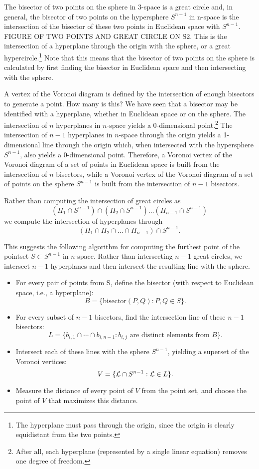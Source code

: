 \documentclass[12pt]{article}
\begin{document}
The bisector of two points on the sphere in 3-space is a great circle and, in general, 
the bisector of two points on the hypersphere $S^{n-1}$ in n-space is 
the intersection of the bisector of these two points in Euclidean space with $S^{n-1}$.
FIGURE OF TWO POINTS AND GREAT CIRCLE ON S2.
This is the intersection of a hyperplane through the origin
with the sphere, or a great hypercircle.\footnote{The
  hyperplane must pass through the origin, since the origin is clearly equidistant
  from the two points.}
Note that this means that the bisector of two points on the sphere is 
calculated by first finding the bisector in Euclidean space 
and then intersecting with the sphere.

A vertex of the Voronoi diagram is defined by the intersection of enough
bisectors to generate a point.
How many is this?
We have seen that a bisector may be identified with a hyperplane, 
whether in Euclidean space or on the sphere.
The intersection of $n$ hyperplanes in $n$-space yields a 0-dimensional 
point.\footnote{After all, each hyperplane (represented by a single linear equation) 
  removes one degree of freedom.}
The intersection of $n-1$ hyperplanes in $n$-space through the origin
yields a 1-dimensional line through the origin
which, when intersected with the hypersphere $S^{n-1}$, also yields a 0-dimensional point.
Therefore, a Voronoi vertex of the Voronoi diagram of a set of points in Euclidean space 
is built from the intersection of $n$ bisectors,
while a Voronoi vertex of the Voronoi diagram of a set of points on the sphere $S^{n-1}$
is built from the intersection of $n-1$ bisectors.

Rather than computing the intersection of great circles as
\[
(H_1 \cap S^{n-1}) \cap (H_2 \cap S^{n-1}) \ldots (H_{n-1} \cap S^{n-1})
\]
we compute the intersection of hyperplanes through
\[
(H_1 \cap H_2 \cap \ldots \cap H_{n-1}) \cap S^{n-1}.
\]

This suggests the following algorithm for computing the furthest point
of the pointset $S \subset S^{n-1}$ in $n$-space.
Rather than intersecting $n-1$ great circles, we intersect $n-1$ hyperplanes
and then intersect the resulting line with the sphere.

\begin{itemize}
\item For every pair of points from S, define the bisector 
      (with respect to Euclidean space, i.e., a hyperplane):
\[
B = \{\mbox{bisector}(P,Q) : P,Q \in S\}.
\]
\item For every subset of $n-1$ bisectors,
      find the intersection line of these $n-1$ bisectors:
\[
L = \{b_{i,1} \cap \cdots \cap b_{i,n-1}: b_{i,j} 
                     \mbox{ are distinct elements from } B\}.
\]
\item Intersect each of these lines with the sphere $S^{n-1}$, 
      yielding a superset of the Voronoi vertices:
\[
V = \{ {\cal L} \cap S^{n-1}: {\cal L} \in L\}.
\]
\item Measure the distance of every point of $V$ from the point set,
      and choose the point of $V$ that maximizes this distance.
\end{itemize}
\end{document}
